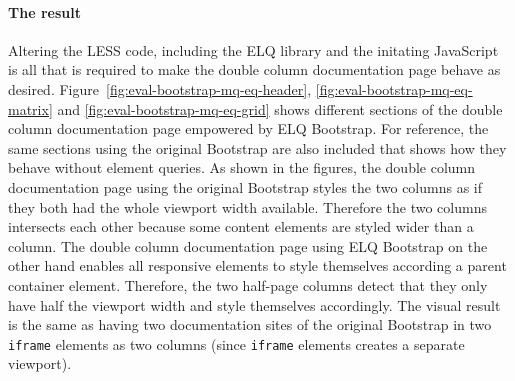 \documentclass[a4paper,11pt]{kth-mag}
\newcommand{\code}[1]{\texttt{#1}}
\begin{document}
      \paragraph{The result}
      Altering the \gls{LESS} code, including the \gls{ELQ} library and the initating \gls{JavaScript} is all that is required to make the double column documentation page behave as desired.
      Figure~\ref{fig:eval-bootstrap-mq-eq-header}, \ref{fig:eval-bootstrap-mq-eq-matrix} and \ref{fig:eval-bootstrap-mq-eq-grid} shows different sections of the double column documentation page empowered by \gls{ELQ} \gls{Bootstrap}.
      For reference, the same sections using the original \gls{Bootstrap} are also included that shows how they behave without element queries.
      As shown in the figures, the double column documentation page using the original \gls{Bootstrap} styles the two columns as if they both had the whole \gls{viewport} width available.
      Therefore the two columns intersects each other because some content \glspl{element} are styled wider than a column.
      The double column documentation page using \gls{ELQ} \gls{Bootstrap} on the other hand enables all \gls{responsive} \glspl{element} to style themselves according a parent container \gls{element}.
      Therefore, the two half-page columns detect that they only have half the \gls{viewport} width and style themselves accordingly.
      The visual result is the same as having two documentation sites of the original \gls{Bootstrap} in two \code{iframe} \glspl{element} as two columns (since \code{iframe} \glspl{element} creates a separate \gls{viewport}).
\end{document}
